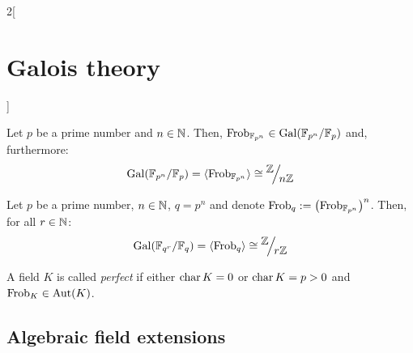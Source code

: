 \documentclass[../../../main.tex]{subfiles}
\begin{document}
\begin{multicols}{2}[\section{Galois theory}]
\begin{definition}
  \end{definition}
  \begin{theorem}
    Let $p$ be a prime number and $n\in\mathbb{N}$. Then, $\text{Frob}_{\mathbb{F}_{p^n}}\in\operatorname{Gal}(\mathbb{F}_{p^n}/\mathbb{F}_p)$ and, furthermore: $$\Gal(\FF_{p^n}/\FF_p)=\langle\text{Frob}_{\FF_{p^n}}\rangle\cong\quot{\ZZ}{n\ZZ}$$
  \end{theorem}
  \begin{corollary}
    Let $p$ be a prime number, $n\in\mathbb{N}$, $q=p^n$ and denote $\text{Frob}_q:={\left(\text{Frob}_{\mathbb{F}_{p^n}}\right)}^n$. Then, for all $r\in\mathbb{N}$: $$\Gal(\FF_{q^r}/\FF_q)=\langle\text{Frob}_q\rangle\cong\quot{\ZZ}{r\ZZ}$$
  \end{corollary}
  \begin{definition}
    A field $K$ is called \emph{perfect} if either $\operatorname{char} K=0$ or $\operatorname{char} K=p>0$ and $\text{Frob}_K\in\operatorname{Aut}(K)$.
  \end{definition}
  \subsection{Algebraic field extensions}

\end{multicols}
\end{document}
